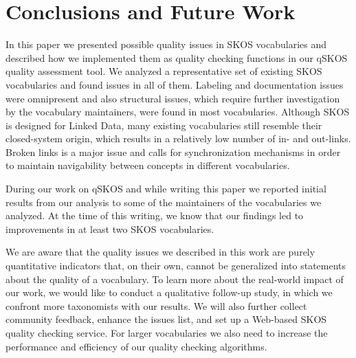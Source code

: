 \section{Conclusions and Future Work}\label{sec:conclusions}

In this paper we presented possible quality issues in SKOS vocabularies and described how we implemented them as quality checking functions in our qSKOS quality assessment tool. We analyzed a representative set of existing SKOS vocabularies and found  issues in all of them. Labeling and documentation issues were omnipresent and also structural issues, which require further investigation by the vocabulary maintainers, were found in most vocabularies. Although SKOS is designed for Linked Data, many existing vocabularies still resemble their closed-system origin, which results in a relatively low number of in- and out-links. Broken links is a major issue and calls for synchronization mechanisms in order to maintain navigability between concepts in different vocabularies.

During our work on qSKOS and while writing this paper we reported initial results from our analysis to some of the maintainers of the vocabularies we analyzed. At the time of this writing, we know that our findings led to improvements in at least two SKOS vocabularies.

We are aware that the quality issues we described in this work are purely quantitative indicators that, on their own, cannot be generalized into statements about the quality of a vocabulary. To learn more about the real-world impact of our work, we would like to conduct a qualitative follow-up study, in which we confront more taxonomists with our results. We will also further collect community feedback, enhance the issues list, and set up a Web-based SKOS quality checking service. For larger vocabularies we also need to increase the performance and efficiency of our quality checking algorithms.